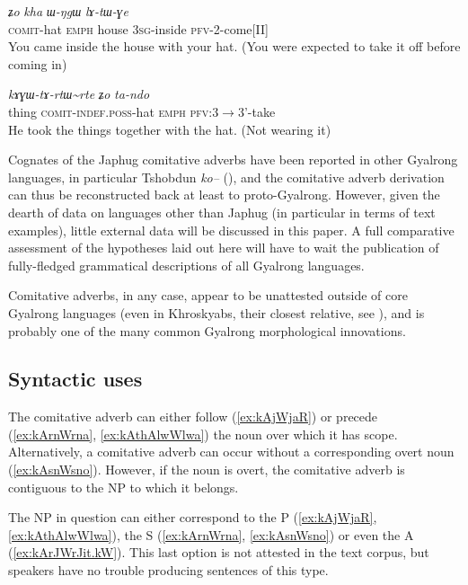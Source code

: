 \documentclass[oldfontcommands,oneside,a4paper,11pt]{article}
\newcommand{\ipa}[1]{{\phon\textit{#1}}} %
\newcommand{\tld}{\textasciitilde{}}
\begin{document}
\begin{exe}
\ex \label{ex:kAGWrtWrte}
\gll \ipa{kɤɣɯ-rtɯ\tld{}rte} 	\ipa{ʑo} 	\ipa{kha} 	\ipa{ɯ-ŋgɯ} 	\ipa{lɤ-tɯ-ɣe} 	\\
\textsc{comit}-hat \textsc{emph} house \textsc{3sg}-inside \textsc{pfv}-2-come[II] \\
\glt You came inside the house with your hat. (You were expected to take it off before coming in)
\end{exe}

\begin{exe}
\ex \label{ex:kAGWtArtWrte}
\gll  \ipa{laχtɕha} 	\ipa{kɤɣɯ-tɤ-rtɯ\tld{}rte} 	\ipa{ʑo} 	\ipa{ta-ndo}  \\
thing \textsc{comit-indef.poss}-hat \textsc{emph} \textsc{pfv}:3$\rightarrow$3'-take \\
\glt He took the things together with the hat. (Not wearing it)
\end{exe}

Cognates of the Japhug comitative adverbs have been reported in other Gyalrong languages, in particular Tshobdun \ipa{ko--} (\citealt[107]{jackson98morphology}), and the comitative adverb derivation can thus be reconstructed back at least to proto-Gyalrong. However, given the dearth of data on languages other than Japhug (in particular in terms of text examples), little external data will be discussed in this paper. A full comparative assessment of the hypotheses laid out here will have to wait the publication of fully-fledged grammatical descriptions of all Gyalrong languages. 

Comitative adverbs, in any case, appear to be unattested outside of core Gyalrong languages (even in Khroskyabs, their closest relative, see \citealt{lai13affixale}), and is probably one of the many common Gyalrong  morphological innovations.

\subsection{Syntactic uses} 

The comitative adverb can either follow (\ref{ex:kAjWjaR}) or precede (\ref{ex:kArnWrna}, \ref{ex:kAthAlwWlwa}) the noun over which it has scope. Alternatively, a comitative adverb can occur without a corresponding overt noun (\ref{ex:kAsnWsno}). However, if the noun is overt, the comitative adverb is contiguous to the NP to which it belongs. 

The NP in question can either correspond to the P (\ref{ex:kAjWjaR}, \ref{ex:kAthAlwWlwa}), the S (\ref{ex:kArnWrna}, \ref{ex:kAsnWsno}) or even the A (\ref{ex:kArJWrJit.kW}). This last option is not attested in the text corpus, but speakers have no trouble producing sentences of this type.
\end{document}
